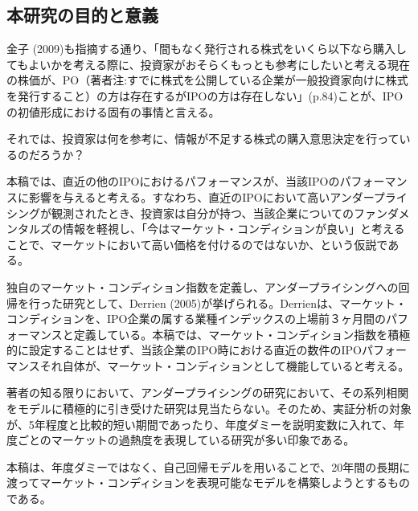 \documentclass{jsarticle}
\begin{document}
\subsection{本研究の目的と意義}
金子 (2009)\cite{kaneko}も指摘する通り、「間もなく発行される株式をいくら以下なら購入してもよいかを考える際に、投資家がおそらくもっとも参考にしたいと考える現在の株価が、PO（著者注:すでに株式を公開している企業が一般投資家向けに株式を発行すること）の方は存在するがIPOの方は存在しない」(p.84)ことが、IPOの初値形成における固有の事情と言える。\\ \par
それでは、投資家は何を参考に、情報が不足する株式の購入意思決定を行っているのだろうか？\\ \par
本稿では、直近の他のIPOにおけるパフォーマンスが、当該IPOのパフォーマンスに影響を与えると考える。すなわち、直近のIPOにおいて高いアンダープライシングが観測されたとき、投資家は自分が持つ、当該企業についてのファンダメンタルズの情報を軽視し、「今はマーケット・コンディションが良い」と考えることで、マーケットにおいて高い価格を付けるのではないか、という仮説である。\par
独自のマーケット・コンディション指数を定義し、アンダープライシングへの回帰を行った研究として、Derrien (2005)\cite{Derrien}が挙げられる。Derrienは、マーケット・コンディションを、IPO企業の属する業種インデックスの上場前３ヶ月間のパフォーマンスと定義している。本稿では、マーケット・コンディション指数を積極的に設定することはせず、当該企業のIPO時における直近の数件のIPOパフォーマンスそれ自体が、マーケット・コンディションとして機能していると考える。\\ \par
著者の知る限りにおいて、アンダープライシングの研究において、その系列相関をモデルに積極的に引き受けた研究は見当たらない。そのため、実証分析の対象が、5年程度と比較的短い期間であったり、年度ダミーを説明変数に入れて、年度ごとのマーケットの過熱度を表現している研究が多い印象である。\par
本稿は、年度ダミーではなく、自己回帰モデルを用いることで、20年間の長期に渡ってマーケット・コンディションを表現可能なモデルを構築しようとするものである。
\end{document}
